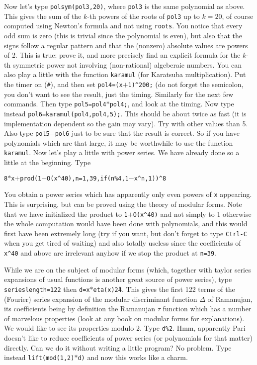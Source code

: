 Now let's type {\tt polsym(pol3,20)}, where {\tt pol3} is the same polynomial
as above. This gives the sum of the $k$-th powers of the roots of {\tt pol3}
up to $k=20$, of course computed using Newton's formula and not using
{\tt roots}. You notice that every odd sum is zero (this is trivial since the
polynomial is even), but also that the signs follow a regular pattern and
that the  (nonzero) absolute values are powers of 2. This is true: prove it,
and more precisely find an explicit formula for the $k$-th symmetric power
not involving (non-rational) algeberaic numbers.
\smallskip
You can also play a little with the function {\tt karamul} (for Karatsuba
multiplication). Put the timer on ({\tt \#}), and then set 
{\tt pol4=(x$+$1)\^{}200;} (do not forget the semicolon, you don't want to
see the result, just the timing. Similarly for the next few commands.
Then type {\tt pol5=pol4$*$pol4;}, and look at the timing. Now type instead
{\tt pol6=karamul(pol4,pol4,5);}. This should be about twice as fast (it is
implementation dependent so the gain may vary). Try with other values than 5.
Also type {\tt pol5$-$pol6} just to be sure that the result is correct.
So if you have polynomials which are that large, it may be worthwhile to use
the function {\tt karamul}.
\medskip
Now let's play a little with power series. We have already done so a little
at the beginning.  Type
\centerline{\tt 8$*$x$+$prod(1$+$O(x\^{}40),n=1,39,if(n\%4,1$-$x\^{}n,1))\^{}8}
You obtain a power series which has apparently only even powers of {\tt x}
appearing. This is surprising, but can be proved using the theory of modular
forms. Note that we have initialized the product to {\tt 1$+$O(x\^{}40)} and
not simply to 1 otherwise the whole computation would have been done with
polynomials, and this would first have been extremely long (try if you want,
but don't forget to type {\tt Ctrl-C} when you get tired of waiting) and also
totally useless since the coefficients of {\tt x\^{}40} and above are 
irrelevant anyhow if we stop the product at {\tt n=39}.

While we are on the subject of modular forms (which, together with taylor
series expansions of usual functions is another great source of power series),
type {\tt\bs serieslength=122} then {\tt d=x$*$eta(x)\^24}. This gives the
first 122 terms of the (Fourier) series expansion of the modular discriminant
function $\Delta$ of Ramanujan, its coefficients being by definition the
Ramanujan $\tau$ function which has a number of marvelous properties (look at
any book on modular forms for explanations). We would like to see its 
properties modulo 2. Type {\tt d\%2}. Hmm, apparently Pari doesn't like to
reduce coefficients of power series (or polynomials for that matter) directly.
Can we do it without writing a little program? No problem. Type instead
{\tt lift(mod(1,2)$*$d)} and now this works like a charm. 

